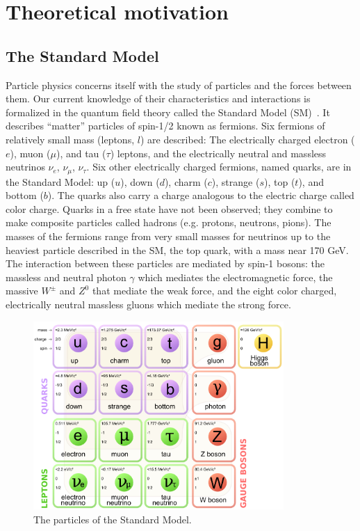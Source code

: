 \clearpage
\section{Theoretical motivation\label{sec:theory}}

\subsection{The Standard Model\label{sec:SM}}

Particle physics concerns itself with the study of particles and the 
forces between them. Our current knowledge of their characteristics and 
interactions is formalized in the quantum field theory called the Standard Model 
(SM)~\cite{bettini2014introduction,griffiths2008introduction}.
It describes ``matter'' particles of spin-1/2 known as 
fermions. Six fermions of relatively small mass (leptons, $l$) are described:
The electrically charged electron ($e$), muon ($\mu$), and tau ($\tau$) 
leptons, and the electrically neutral and massless neutrinos 
$\nu_{e}$, $\nu_{\mu}$, $\nu_{\tau}$.  
Six other electrically charged 
fermions, named quarks, are in the Standard Model: up ($u$), down ($d$), 
charm ($c$), strange ($s$), top ($t$), and bottom ($b$). The quarks also carry
a charge analogous to the electric charge called color charge. Quarks in a 
free state have not been observed; they combine to make composite
particles called hadrons (e.g. protons, neutrons, pions). The masses of the 
fermions range from very small masses for neutrinos up to the heaviest 
particle described in the SM, the top quark, with a mass near 170 GeV. \\
\indent The interaction between these particles are mediated by spin-1 bosons: 
the massless and neutral photon $\gamma$ which mediates the electromagnetic force, 
the massive $W^\pm$ and $Z^0$ that mediate the weak force, and the eight color 
charged, electrically neutral massless gluons which mediate the strong force.

\begin{figure}[h!t]
  \begin{center}
       \includegraphics[width=0.85\textwidth,]{figures/Standard_Model_of_Elementary_Particles.png}
       \caption{The particles of the Standard Model.}
    \label{fig:SM-particles}
  \end{center}
\end{figure}

